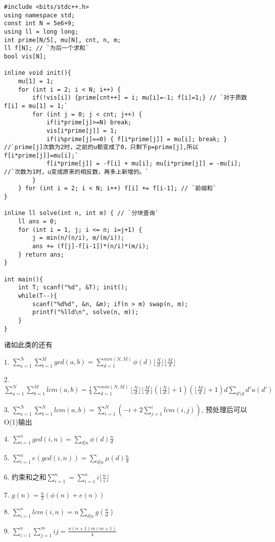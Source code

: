 \begin{lstlisting}
#include <bits/stdc++.h>
using namespace std;
const int N = 5e6+9;
using ll = long long;
int prime[N/5], mu[N], cnt, n, m;
ll f[N]; // `为后一个求和`
bool vis[N];

inline void init(){
    mu[1] = 1;
    for (int i = 2; i < N; i++) {
        if(!vis[i]) {prime[cnt++] = i; mu[i]=-1; f[i]=1;} // `对于质数f[i] = mu[1] = 1;`
        for (int j = 0; j < cnt; j++) {
            if(i*prime[j]>=N) break;
            vis[i*prime[j]] = 1;
            if(i%prime[j]==0) { f[i*prime[j]] = mu[i]; break; } //`prime[j]次数为2时，之前的u都变成了0，只剩下p=prime[j],所以f[i*prime[j]]=mu[i];`
            f[i*prime[j]] = -f[i] + mu[i]; mu[i*prime[j]] = -mu[i]; //`次数为1时，u变成原来的相反数，再多上新增的。`
        }
    } for (int i = 2; i < N; i++) f[i] += f[i-1]; // `前缀和`
}

inline ll solve(int n, int m) { // `分块查询`
    ll ans = 0;
    for (int i = 1, j; i <= n; i=j+1) {
        j = min(n/(n/i), m/(m/i));
        ans += (f[j]-f[i-1])*(n/i)*(m/i);
    } return ans;
}

int main(){
    int T; scanf("%d", &T); init();
    while(T--){
        scanf("%d%d", &n, &m); if(n > m) swap(n, m);
        printf("%lld\n", solve(n, m));
    }
}
\end{lstlisting}

诸如此类的还有

1. $\sum_{a=1}^{N} \sum_{b=1}^M gcd(a, b) = \sum_{d=1}^{min(N, M)} \phi(d) \lfloor \frac{N}{d} \rfloor \lfloor \frac{M}{d} \rfloor$

2. $\sum_{a=1}^{N} \sum_{b=1}^M lcm(a, b) = \frac{1}{4}\sum_{d=1}^{min(N, M)} \lfloor \frac{N}{d} \rfloor \lfloor \frac{M}{d} \rfloor(\lfloor \frac{N}{d} \rfloor + 1)(\lfloor \frac{M}{d} \rfloor+1) d \sum_{d'|d}d'u(d') $

3. $\sum_{a=1}^{N} \sum_{b=1}^N lcm(a, b) = \sum_{i=1}^N (-i+2\sum_{j=1}^ilcm(i,j))$, 预处理后可以O(1)输出

4. $\sum_{i=1}^n gcd(i, n) = \sum_{d|n}\phi(d) \frac{n}{d}$

5. $\sum_{i=1}^n e(gcd(i, n)) = \sum_{d|n}\mu(d) \frac{n}{d}$

6. 约束和之和$\sum_{i=1}^n = \sum_{i=1}^n i \lfloor \frac{n}{i} \rfloor$

7. $g(n)=\frac{n}{2}(\phi(n)+e(n))$

8. $\sum_{i=1}^n lcm(i, n) = n\sum_{d|n}g(\frac{n}{d})$

9. $\sum_{i=1}^n\sum_{j=1}^mij = \frac{n(n+1)m(m+1)}{4}$

